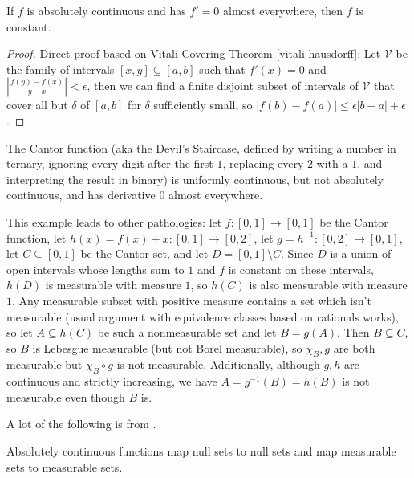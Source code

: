 \documentclass[letterpaper,11pt]{report}
\begin{document}
\begin{cor} If $f$ is absolutely continuous and has $f' = 0$ almost everywhere, then $f$ is constant.
\end{cor}
\begin{proof} Direct proof based on Vitali Covering Theorem \ref{vitali-hausdorff}: Let $\mathcal{V}$ be the family of intervals $[x,y] \subseteq [a,b]$ such that $f'(x) = 0$ and $|\frac{f(y)-f(x)}{y-x}| < \epsilon$, then we can find a finite disjoint subset of intervals of $\mathcal{V}$ that cover all but $\delta$ of $[a,b]$ for $\delta$ sufficiently small, so $|f(b)-f(a)| \le \epsilon|b-a| + \epsilon$.
\end{proof}

\begin{ex} The Cantor function (aka the Devil's Staircase, defined by writing a number in ternary, ignoring every digit after the first $1$, replacing every $2$ with a $1$, and interpreting the result in binary) is uniformly continuous, but not absolutely continuous, and has derivative $0$ almost everywhere.

This example leads to other pathologies: let $f : [0,1] \rightarrow [0,1]$ be the Cantor function, let $h(x) = f(x)+x : [0,1] \rightarrow [0,2]$, let $g = h^{-1} : [0,2] \rightarrow [0,1]$, let $C \subseteq [0,1]$ be the Cantor set, and let $D = [0,1]\setminus C$. Since $D$ is a union of open intervals whose lengths sum to $1$ and $f$ is constant on these intervals, $h(D)$ is measurable with measure $1$, so $h(C)$ is also measurable with measure $1$. Any measurable subset with positive measure contains a set which isn't measurable (usual argument with equivalence classes based on rationals works), so let $A \subseteq h(C)$ be such a nonmeasurable set and let $B = g(A)$. Then $B \subseteq C$, so $B$ is Lebesgue measurable (but not Borel measurable), so $\chi_B,g$ are both measurable but $\chi_B\circ g$ is not measurable. Additionally, although $g,h$ are continuous and strictly increasing, we have $A = g^{-1}(B) = h(B)$ is not measurable even though $B$ is.
\end{ex}


A lot of the following is from \cite{gauge-integral}.

\begin{prop} Absolutely continuous functions map null sets to null sets and map measurable sets to measurable sets.
\end{prop}
\end{document}
